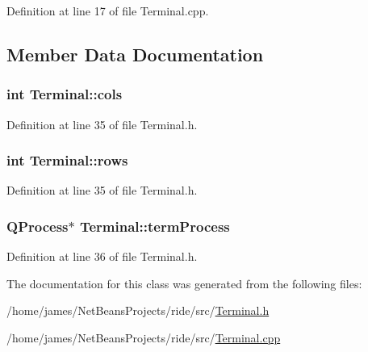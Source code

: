 Definition at line 17 of file Terminal.\-cpp.



\subsection{Member Data Documentation}
\hypertarget{class_terminal_a7d56233a2d7c1c4ecdba979a73287b68}{
\subsubsection[{cols}]{\setlength{\rightskip}{0pt plus 5cm}int Terminal\-::cols\hspace{0.3cm}{\ttfamily [private]}}}\label{class_terminal_a7d56233a2d7c1c4ecdba979a73287b68}


Definition at line 35 of file Terminal.\-h.

\hypertarget{class_terminal_a313f2303fb304b5c317cbda44b861a54}{
\subsubsection[{rows}]{\setlength{\rightskip}{0pt plus 5cm}int Terminal\-::rows\hspace{0.3cm}{\ttfamily [private]}}}\label{class_terminal_a313f2303fb304b5c317cbda44b861a54}


Definition at line 35 of file Terminal.\-h.

\hypertarget{class_terminal_a7b62ba5151a7e984fa76ba2e67758bb0}{
\subsubsection[{term\-Process}]{\setlength{\rightskip}{0pt plus 5cm}Q\-Process$\ast$ Terminal\-::term\-Process\hspace{0.3cm}{\ttfamily [private]}}}\label{class_terminal_a7b62ba5151a7e984fa76ba2e67758bb0}


Definition at line 36 of file Terminal.\-h.



The documentation for this class was generated from the following files\-:\begin{DoxyCompactItemize}
\item 
/home/james/\-Net\-Beans\-Projects/ride/src/\hyperlink{_terminal_8h}{Terminal.\-h}\item 
/home/james/\-Net\-Beans\-Projects/ride/src/\hyperlink{_terminal_8cpp}{Terminal.\-cpp}\end{DoxyCompactItemize}
